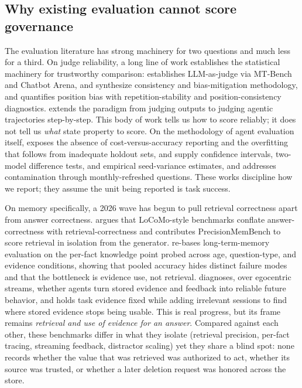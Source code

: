 \subsection{Why existing evaluation cannot score governance}

The evaluation literature has strong machinery for two questions and much less for a third. On judge reliability, a long line of work establishes the statistical machinery for trustworthy comparison: \citet{zheng2023judgingllmasajudge} establishes LLM-as-judge via MT-Bench and Chatbot Arena, \citet{gu2024surveyllmasajudge} and \citet{li2024llmsasjudgessurvey} synthesize consistency and bias-mitigation methodology, and \citet{shi2024judgingthejudges} quantifies position bias with repetition-stability and position-consistency diagnostics. \citet{you2026agentasjudge} extends the paradigm from judging outputs to judging agentic trajectories step-by-step. This body of work tells us how to score reliably; it does not tell us \emph{what} state property to score. On the methodology of agent evaluation itself, \citet{kapoor2024aiagentsthatmatter} exposes the absence of cost-versus-accuracy reporting and the overfitting that follows from inadequate holdout sets, \citet{miller2024errorbarsevals} and \citet{madaan2024quantifyingvariance} supply confidence intervals, two-model difference tests, and empirical seed-variance estimates, and \citet{white2024livebench} addresses contamination through monthly-refreshed questions. These works discipline how we report; they assume the unit being reported is task success.

On memory specifically, a 2026 wave has begun to pull retrieval correctness apart from answer correctness. \citet{flynt2026precisionmembench} argues that LoCoMo-style benchmarks conflate answer-correctness with retrieval-correctness and contributes PrecisionMemBench to score retrieval in isolation from the generator. \citet{long2026memtrace} re-bases long-term-memory evaluation on the per-fact knowledge point probed across age, question-type, and evidence conditions, showing that pooled accuracy hides distinct failure modes and that the bottleneck is evidence use, not retrieval. \citet{liu2026streammembench} diagnoses, over egocentric streams, whether agents turn stored evidence and feedback into reliable future behavior, and \citet{shao2026scaleconditioned} holds task evidence fixed while adding irrelevant sessions to find where stored evidence stops being usable. This is real progress, but its frame remains \emph{retrieval and use of evidence for an answer}. Compared against each other, these benchmarks differ in what they isolate (retrieval precision, per-fact tracing, streaming feedback, distractor scaling) yet they share a blind spot: none records whether the value that was retrieved was authorized to act, whether its source was trusted, or whether a later deletion request was honored across the store.

